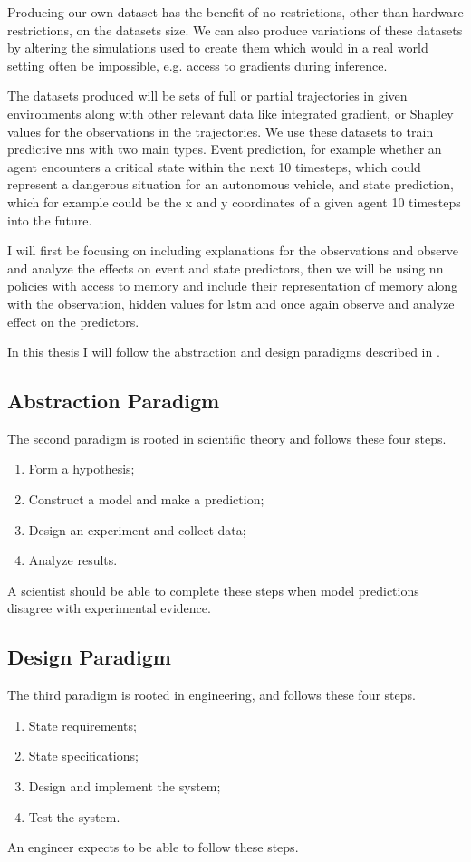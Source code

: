 \documentclass[UKenglish]{uiomasterthesis}
\begin{document}
Producing our own dataset has the benefit of no restrictions, other than hardware restrictions, on the datasets size. We can also produce variations of these datasets by altering the simulations used to create them which would in a real world setting often be impossible, e.g. access to gradients during inference.

The datasets produced will be sets of full or partial trajectories in given environments along with other relevant data like integrated gradient, or Shapley values for the observations in the trajectories. We use these datasets to train predictive \acp{nn} with two main types. Event prediction, for example whether an agent encounters a critical state within the next 10 timesteps, which could represent a dangerous situation for an autonomous vehicle, and state prediction, which for example could be the x and y coordinates of a given agent 10 timesteps into the future.

I will first be focusing on including explanations for the observations and observe and analyze the effects on event and state predictors, then we will be using \ac{nn} policies with access to memory and include their representation of memory along with the observation, hidden values for \ac{lstm} and once again observe and analyze effect on the predictors.

In this thesis I will follow the abstraction and design paradigms described in \cite{acm}.

\subsection{Abstraction Paradigm}
The second paradigm is rooted in scientific theory and follows these four steps.
\begin{enumerate}
    \item Form a hypothesis;
    \item Construct a model and make a prediction;
    \item Design an experiment and collect data;
    \item Analyze results.
\end{enumerate}
A scientist should be able to complete these steps when model predictions disagree with experimental evidence.


\subsection{Design Paradigm}
The third paradigm is rooted in engineering, and follows these four steps.
\begin{enumerate}
    \item State requirements;
    \item State specifications;
    \item Design and implement the system;
    \item Test the system.
\end{enumerate}
An engineer expects to be able to follow these steps.
\end{document}
